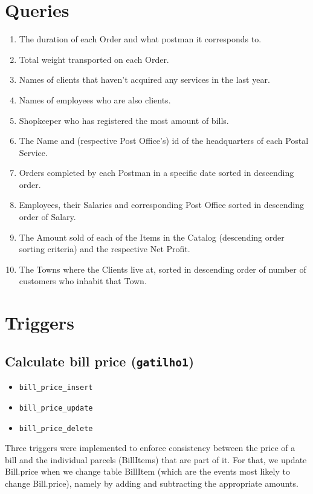 \documentclass{report}[a4paper]
\theoremstyle{remark}
\begin{document}
\chapter{Queries}

\begin{enumerate}
    \item The duration of each Order and what postman it corresponds to.
    \item Total weight transported on each Order.
    \item Names of clients that haven't acquired any services in the last year.
    \item Names of employees who are also clients.
    \item Shopkeeper who has registered the most amount of bills.
    \item The Name and (respective Post Office's) id of the headquarters of each Postal Service.
    \item Orders completed by each Postman in a specific date sorted in descending order.
    \item Employees, their Salaries and corresponding Post Office sorted in descending order of Salary.
    \item The Amount sold of each of the Items in the Catalog (descending order sorting criteria) and the respective Net Profit.
    \item The Towns where the Clients live at, sorted in descending order of number of customers who inhabit that Town.
\end{enumerate}

\chapter{Triggers}
\section{Calculate bill price (\texttt{gatilho1})}
\begin{itemize}
    \item \texttt{bill\_price\_insert}
    \item \texttt{bill\_price\_update}
    \item \texttt{bill\_price\_delete}
\end{itemize}
Three triggers were implemented to enforce consistency between the price of a bill and the individual parcels (BillItems) that are part of it. For that, we update Bill.price when we change table BillItem (which are the events most likely to change Bill.price), namely by adding and subtracting the appropriate amounts.
\end{document}
